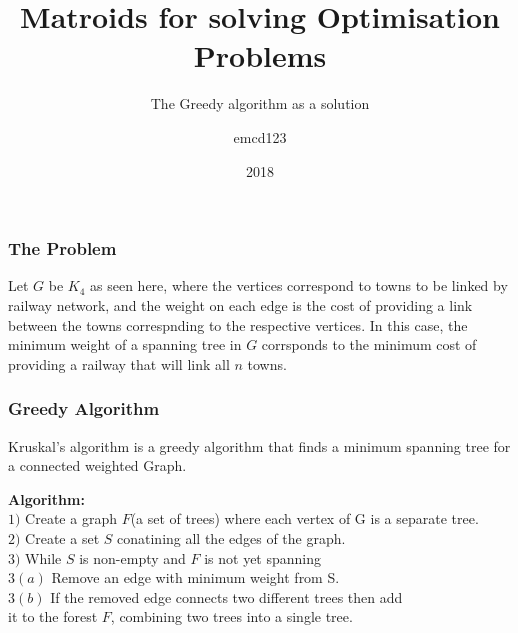 \documentclass{beamer}
\title[Matroids] %
{Matroids for solving Optimisation Problems}
\subtitle{The Greedy algorithm as a solution}
\author{emcd123}
\institute{NUI Galway}
\date{2018}
\newcommand\Algorithm{%
  \textbf{Algorithm:}\\%
}
\begin{document}
 
\frame{\titlepage}
 
\begin{frame}
\frametitle{The Problem}
\begin{minipage}{.2\textwidth}
\end{minipage}
\hspace{2.5cm} \begin{minipage}{.5\textwidth}
Let $G$ be $K_4$ as seen here, where the vertices correspond to towns to be linked by railway network, and the weight on each edge is the cost of providing a link between the towns correspnding to the respective vertices. In this case, the minimum weight of a spanning tree in $G$ corrsponds to the minimum cost of providing a railway that will link all $n$ towns.
\end{minipage}
\end{frame}

\begin{frame}
\frametitle{Greedy Algorithm}
Kruskal's algorithm is a greedy algorithm that finds a minimum spanning tree for a connected weighted Graph.

\vspace{4mm}

\Algorithm
$1)$ Create a graph $F$(a set of trees) where each vertex of G is a separate tree.\\
$2)$ Create a set $S$ conatining all the edges of the graph.\\
$3)$ While $S$ is non-empty and $F$ is not yet spanning\\
\hspace{5mm} $3(a)$ Remove an edge with minimum weight from S.\\
\hspace{5mm} $3(b)$ If the removed edge connects two different trees then add \\
\hspace{5mm} it to the forest $F$, combining two trees into a single tree.\\
	


\end{frame}
\end{document}
